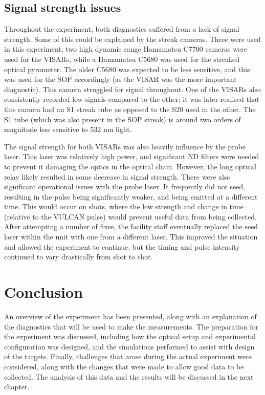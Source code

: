 \subsection{Signal strength issues}

Throughout the experiment, both diagnostics suffered from a lack of signal strength. Some of this could be explained by the streak cameras. Three were used in this experiment; two high dynamic range Hamamatsu C7700 cameras were used for the VISARs, while a Hamamatsu C5680 was used for the streaked optical pyrometer. The older C5680 was expected to be less sensitive, and this was used for the SOP accordingly (as the VISAR was the more important diagnostic). This camera struggled for signal throughout. One of the VISARs also consistently recorded low signals compared to the other; it was later realised that this camera had an S1 streak tube as opposed to the S20 used in the other. The S1 tube (which was also present in the SOP streak) is around two orders of magnitude less sensitive to 532 \unit{\nano\meter} light.

The signal strength for both VISARs was also heavily influence by the probe laser. This laser was relatively high power, and significant ND filters were needed to prevent it damaging the optics in the optical chain. However, the long optical relay likely resulted in some decrease in signal strength. There were also significant operational issues with the probe laser. It frequently did not seed, resulting in the pulse being significantly weaker, and being emitted at a different time. This would occur on shots, where the low strength and change in time (relative to the VULCAN pulse) would prevent useful data from being collected. After attempting a number of fixes, the facility staff eventually replaced the seed laser within the unit with one from a different laser. This improved the situation and allowed the experiment to continue, but the timing and pulse intensity continued to vary drastically from shot to shot.

\section{Conclusion}
An overview of the experiment has been presented, along with an explanation of the diagnostics that will be used to make the measurements. The preparation for the experiment was discussed, including how the optical setup and experimental configuration was designed, and the simulations performed to assist with design of the targets. Finally, challenges that arose during the actual experiment were considered, along with the changes that were made to allow good data to be collected. The analysis of this data and the results will be discussed in the next chapter.

